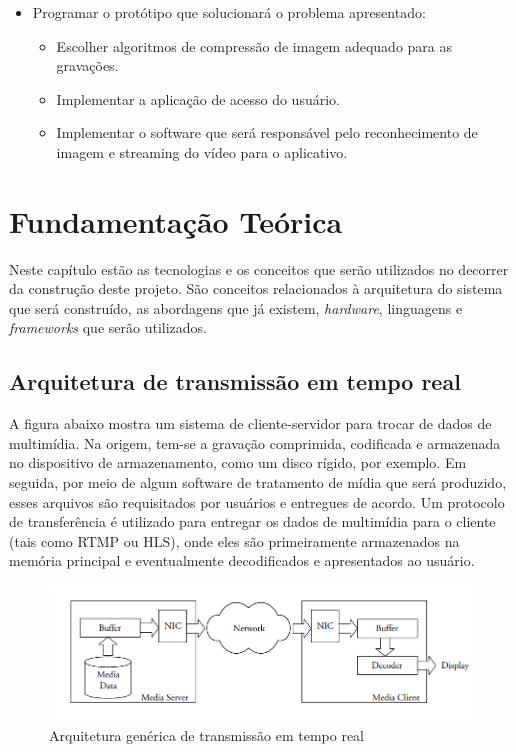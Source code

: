 \documentclass[12pt, %
openright, 
oneside, %
a4paper,    %
brazil]{facom-ufu-abntex2}
\begin{document}
\begin{itemize}
  \item  Programar o protótipo que solucionará o problema apresentado:
  \begin{itemize}
    \item Escolher algoritmos de compressão de imagem adequado para as gravações.
    \item Implementar a aplicação de acesso do usuário.
    \item Implementar o software que será responsável pelo reconhecimento de imagem e streaming do vídeo para o aplicativo.
  \end{itemize}
\end{itemize}




\chapter{Fundamentação Teórica}


Neste capítulo estão as tecnologias e os conceitos que serão utilizados no decorrer da construção deste projeto.
São conceitos relacionados à arquitetura do sistema que será construído, as abordagens que já existem, \emph{hardware}, 
linguagens e \emph{frameworks} que serão utilizados.


\section{Arquitetura de transmissão em tempo real}
 
A figura abaixo mostra um sistema de cliente-servidor para trocar de dados de multimídia.
Na origem, tem-se a gravação comprimida, codificada e armazenada no dispositivo de armazenamento,
como um disco rígido, por exemplo. Em seguida, por meio de algum software de tratamento de mídia que será produzido,
esses arquivos são requisitados por usuários e entregues de acordo. Um protocolo de transferência é utilizado para
entregar os dados de multimídia para o cliente (tais como RTMP ou HLS), onde eles são primeiramente armazenados
na memória principal e eventualmente decodificados e apresentados ao usuário.


\begin{figure}[!ht]
  \centering
\includegraphics[width=1\linewidth]{Capturar.PNG}
\caption[Representação de um arquitetura de tempo real genérica]{Arquitetura genérica de transmissão em tempo real}
\label{fig:graficosVariandoTamanhoRede}
\end{figure}
\end{document}
